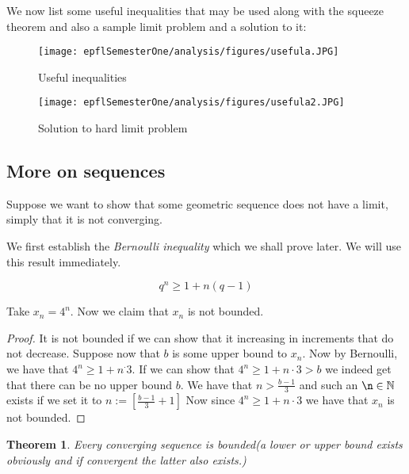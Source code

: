 \documentclass[titlepage]{article}
\newtheorem{theorem}{Theorem}[section]
\numberwithin{equation}{subsection}
\begin{document}
We now list some useful inequalities that may be used along with the squeeze theorem and also a sample limit problem and a solution to it:

\begin{figure}[h]
    \centering
    \texttt{[image: epflSemesterOne/analysis/figures/usefula.JPG]}
    \caption{Useful inequalities}
    \label{fig1}
\end{figure}

\begin{figure}[H]
    \centering
    \texttt{[image: epflSemesterOne/analysis/figures/usefula2.JPG]}
    \caption{Solution to hard limit problem}
    \label{fig2}
\end{figure}

\subsection{More on sequences}
Suppose we want to show that some geometric sequence does not have a limit, simply that it is not converging.

We first establish the \textit{Bernoulli inequality} which we shall prove later. We will use this result immediately. 

\begin{equation}
    q^n \geq 1 + n(q-1)
\end{equation}

\begin{tcolorbox}
Take $x_{n} = 4^n$. Now we claim that $x_{n}$ is not bounded.
\begin{proof}
It is not bounded if we can show that it increasing in increments that do not decrease. Suppose now that $b$ is some upper bound to $x_{n}$. Now by Bernoulli, we have that $4^n \geq 1 + n^\cdot3$. If we can show that $4^n \geq 1 + n\cdot3 > b$ we indeed get that there can be no upper bound $b$. We have that $n > \frac{b-1}{3}$ and such an $\n \in \mathbb{N}$ exists if we set it to $n:= [\frac{b-1}{3} + 1]$ Now since $4^n \geq 1 + n\cdot3$ we have that $x_{n}$ is not bounded. 

\end{proof}
\end{tcolorbox}

\begin{theorem}
Every converging sequence is bounded(a lower or upper bound exists obviously and if convergent the latter also exists.)
\end{theorem}

\clearpage
\end{document}

